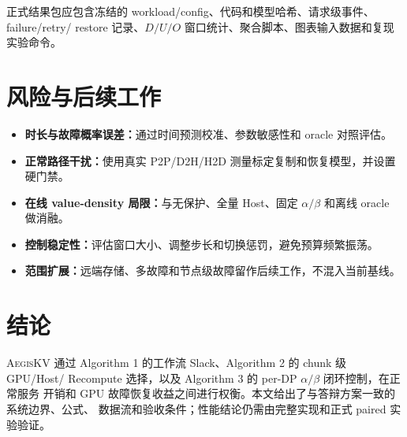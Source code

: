 \documentclass[UTF8,11pt,a4paper]{ctexart}
\newcommand{\systemname}{\textsc{AegisKV}}
\begin{document}
正式结果包应包含冻结的 workload/config、代码和模型哈希、请求级事件、failure/retry/
restore 记录、$D/U/O$ 窗口统计、聚合脚本、图表输入数据和复现实验命令。

\section{风险与后续工作}

\begin{itemize}
  \item \textbf{时长与故障概率误差：}通过时间预测校准、参数敏感性和 oracle 对照评估。
  \item \textbf{正常路径干扰：}使用真实 P2P/D2H/H2D 测量标定复制和恢复模型，并设置硬门禁。
  \item \textbf{在线 value-density 局限：}与无保护、全量 Host、固定 $\alpha/\beta$ 和离线 oracle 做消融。
  \item \textbf{控制稳定性：}评估窗口大小、调整步长和切换惩罚，避免预算频繁振荡。
  \item \textbf{范围扩展：}远端存储、多故障和节点级故障留作后续工作，不混入当前基线。
\end{itemize}

\section{结论}

\systemname{} 通过 Algorithm 1 的工作流 Slack、Algorithm 2 的 chunk 级 GPU/Host/
Recompute 选择，以及 Algorithm 3 的 per-DP $\alpha/\beta$ 闭环控制，在正常服务
开销和 GPU 故障恢复收益之间进行权衡。本文给出了与答辩方案一致的系统边界、公式、
数据流和验收条件；性能结论仍需由完整实现和正式 paired 实验验证。

\clearpage


\end{document}
